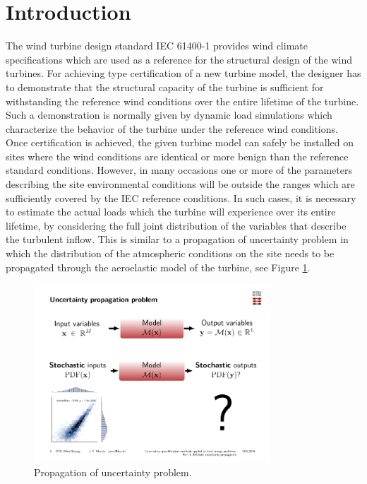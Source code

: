 \documentclass[preprint,12pt]{elsarticle}
\begin{document}
\linenumbers

\section{Introduction}
\label{sec_Introduction}

The wind turbine design standard IEC 61400-1 \cite{international2005iec} provides wind climate specifications which are used as a reference for the structural design of the wind turbines. For achieving type certification of a new turbine model, the designer has to demonstrate that the structural capacity of the turbine is sufficient for withstanding the reference wind conditions over the entire lifetime of the turbine. Such a demonstration is normally given by dynamic load simulations which characterize the behavior of the turbine under the reference wind conditions. Once certification is achieved, the given turbine model can safely be installed on sites where the wind conditions are identical or more benign than the reference standard conditions. However, in many occasions one or more of the parameters describing the site environmental conditions will be outside the ranges which are sufficiently covered by the IEC reference conditions. In such cases, it is necessary to estimate the actual loads which the turbine will experience over its entire lifetime, by considering the full joint distribution of the variables that describe the turbulent inflow. This is similar to a propagation of uncertainty problem in which the distribution of the atmospheric conditions on the site needs to be propagated through the aeroelastic model of the turbine, see Figure \ref{fig_0_propagation}. 

\begin{figure}[h!]
\begin{centering}
\includegraphics[width=3.5in]{Figures/0_problem_statement.pdf}
\caption{Propagation of uncertainty problem.}
\label{fig_0_propagation}
\end{centering}
\end{figure}
\end{document}
